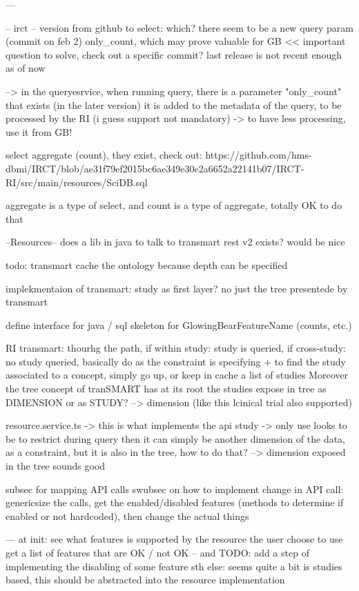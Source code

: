 ---

-- irct --
version from github to select: which? there seem to be a new query param (commit on feb 2) only\_count, which may prove valuable for GB << important question to solve, check out a specific commit? last release is not recent enough as of now 

--> in the queryesrvice, when running query, there is a parameter "only\_count" that exists (in the later version)
it is added to the metadata of the query, to be processed by the RI (i guess support not mandatory) 
-> to have less processing, use it from GB!

select aggregate (count), they exist, check out: https://github.com/hms-dbmi/IRCT/blob/ae31f79ef2015bc6ae349e30e2a6652a22141b07/IRCT-RI/src/main/resources/SciDB.sql

aggregate is a type of select, and count is a type of aggregate, totally OK to do that 



--Resources--
does a lib in java to talk to transmart rest v2 exists? would be nice


todo: transmart cache the ontology because depth can be specified

implekmentaion of transmart: study as first layer? no just the tree presentede by transmart

define interface for java / sql skeleton for GlowingBearFeatureName (counts, etc.)


RI transmart: thourhg the path, if within study: study is queried, if cross-study: no study queried, basically do as the constraint is specifying
+ to find the study associated to a concept, simply go up, or keep in cache a list of studies
Moreover the tree concept of tranSMART has at its root the studies
expose in tree as DIMENSION or as STUDY? --> dimension (like this lcinical trial also supported)


resource.service.ts -> this is what implements the api
study -> only use looks to be to restrict during query
then it can simply be another dimension of the data, as a constraint, but it is also in the tree, how to do that?
--> dimension exposed in the tree sounds good

subsec for mapping API calls
swubsec on how to implement change in API call: genericsize the calls, get the enabled/disabled features (methods to determine if enabled or not hardcoded), then change the actual things

---
at init: see what features is supported by the resource the user choose to use
get a list of features that are OK / not OK -- and TODO: add a step of implementing the disabling of some feature
sth else: seems quite a bit is studies based, this should be abstracted into the resource implementation

